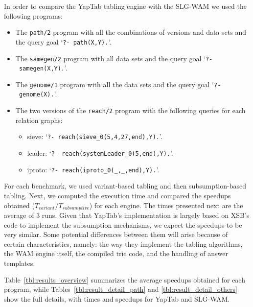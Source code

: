 In order to compare the YapTab tabling engine with the SLG-WAM we used the following programs:

\begin{itemize}
   \item The \texttt{path/2} program with all the combinations of
   versions and data sets and the query goal `\texttt{?-~path(X,Y).}'.
   
   \item The \texttt{samegen/2} program with all data sets and the query goal `\texttt{?-~samegen(X,Y).}'.
   
   \item The \texttt{genome/1} program with all the data sets and the query goal `\texttt{?-~genome(X).}'.
   
   \item The two versions of the \texttt{reach/2} program with the following queries for each relation graphs:

   \begin{itemize}
      \item sieve: `\texttt{?-~reach(sieve\_0(5,4,27,end),Y).}'.
      \item leader: `\texttt{?-~reach(systemLeader\_0(5,end),Y).}'.
      \item iproto: `\texttt{?-~reach(iproto\_0(\_,\_,end),Y).}'.
   \end{itemize}

\end{itemize}

For each benchmark, we used variant-based tabling and then subsumption-based tabling.
Next, we computed the execution time and compared the speedups obtained ($T_{variant} / T_{subsumptive}$) for
each engine. The times presented next are the average of 3 runs. Given that YapTab's implementation
is largely based on XSB's code to implement the subsumption mechanisms,
we expect the speedups to be very similar. Some potential differences between them will arise because
of certain characteristics, namely: the way they implement the tabling algorithms, the WAM engine itself,
the compiled trie code, and the handling of answer templates.

Table~\ref{tbl:results_overview} summarizes the average speedups obtained for each program,
while Tables~\ref{tbl:result_detail_path} and \ref{tbl:result_detail_others}
show the full details, with times and speedups for YapTab and SLG-WAM.

